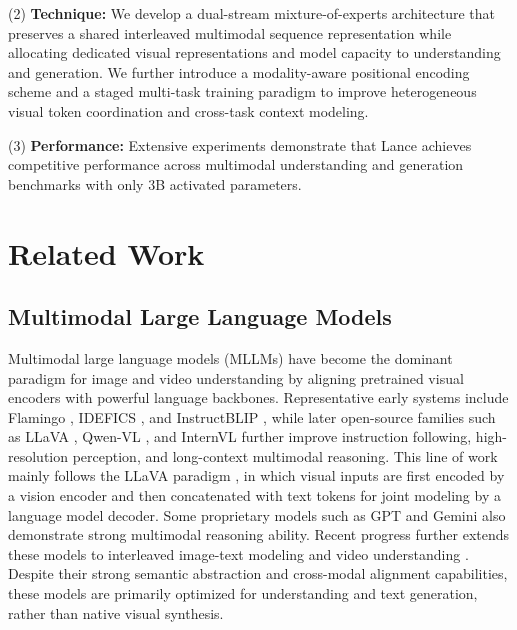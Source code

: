 \documentclass{llmxive}
\begin{document}
(2) \textbf{Technique:}
We develop a dual-stream mixture-of-experts architecture that preserves a shared interleaved multimodal sequence representation while allocating dedicated visual representations and model capacity to understanding and generation. We further introduce a modality-aware positional encoding scheme and a staged multi-task training paradigm to improve heterogeneous visual token coordination and cross-task context modeling.

(3) \textbf{Performance:} Extensive experiments demonstrate that Lance achieves competitive performance across multimodal understanding and generation benchmarks with only $3$B activated parameters. 






\section{Related Work}
\label{sec:Related Work}


\subsection{Multimodal Large Language Models}
Multimodal large language models (MLLMs) have become the dominant paradigm for image and video understanding by aligning pretrained visual encoders with powerful language backbones.
Representative early systems include Flamingo \cite{alayrac2022flamingo}, IDEFICS \cite{laurenccon2023obelics}, and InstructBLIP \cite{dai2023instructblip}, while later open-source families such as LLaVA \cite{liu2023visual,liu2024improved,liu2024llavanext,li2024llava}, Qwen-VL \cite{Qwen-VL,Qwen2-VL,Qwen2.5-VL,Qwen3-VL}, and InternVL \cite{chen2024internvl,gao2024mini,chen2024far,wang2025internvl3_5} further improve instruction following, high-resolution perception, and long-context multimodal reasoning. 
This line of work mainly follows the LLaVA paradigm \cite{liu2023visual}, in which visual inputs are first encoded by a vision encoder \cite{radford2021learning,tschannen2025siglip} and then concatenated with text tokens for joint modeling by a language model decoder.
Some proprietary models such as GPT \cite{achiam2023gpt} and Gemini \cite{team2024gemini,team2023gemini} also demonstrate strong multimodal reasoning ability. 
Recent progress further extends these models to interleaved image-text modeling \cite{yang2024vision,cui2025emu3,deng2025emerging} and video understanding \cite{li2025videochat,lin2024video,yang2025cambrian}.
Despite their strong semantic abstraction and cross-modal alignment capabilities, these models are primarily optimized for understanding and text generation, rather than native visual synthesis.
\end{document}
